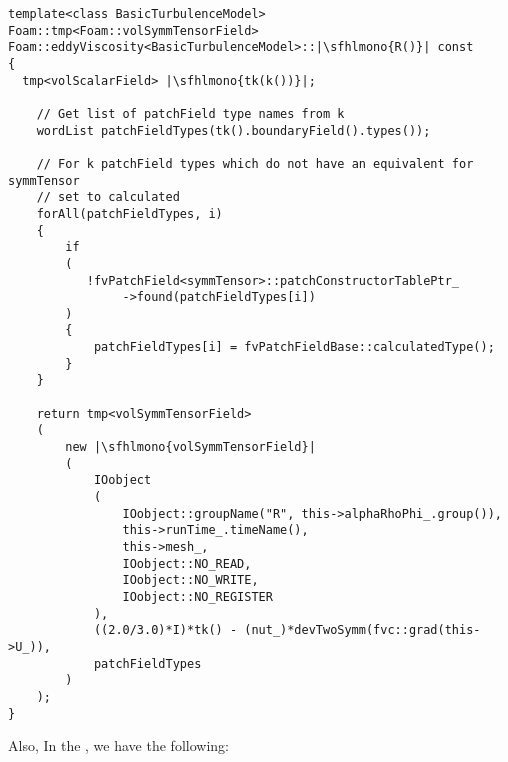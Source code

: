 \begin{listing}[H]
  \renewcommand\theFancyVerbLine{%
    \ifnum\value{FancyVerbLine}=86
      \boxed{\texttt{\arabic{FancyVerbLine}}}
    \else
      \ifnum\value{FancyVerbLine}=120
        \boxed{\texttt{\arabic{FancyVerbLine}}}
      \else
        \textcolor{black}{\color{MidGrey}\arabic{FancyVerbLine}}%
      \fi
    \fi
  }
\begin{verbatim}
template<class BasicTurbulenceModel>
Foam::tmp<Foam::volSymmTensorField>
Foam::eddyViscosity<BasicTurbulenceModel>::|\sfhlmono{R()}| const
{
  tmp<volScalarField> |\sfhlmono{tk(k())}|;

    // Get list of patchField type names from k
    wordList patchFieldTypes(tk().boundaryField().types());

    // For k patchField types which do not have an equivalent for symmTensor
    // set to calculated
    forAll(patchFieldTypes, i)
    {
        if
        (
           !fvPatchField<symmTensor>::patchConstructorTablePtr_
                ->found(patchFieldTypes[i])
        )
        {
            patchFieldTypes[i] = fvPatchFieldBase::calculatedType();
        }
    }

    return tmp<volSymmTensorField>
    (
        new |\sfhlmono{volSymmTensorField}|
        (
            IOobject
            (
                IOobject::groupName("R", this->alphaRhoPhi_.group()),
                this->runTime_.timeName(),
                this->mesh_,
                IOobject::NO_READ,
                IOobject::NO_WRITE,
                IOobject::NO_REGISTER
            ),
            ((2.0/3.0)*I)*tk() - (nut_)*devTwoSymm(fvc::grad(this->U_)),
            patchFieldTypes
        )
    );
}
\end{verbatim}
\caption{\small{\protect{}}}
\end{listing}
%
Also, In the , we have the following:
%
